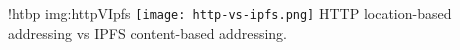 \namedfigure
{!htbp}
{img:httpVIpfs}
{\texttt{[image: http-vs-ipfs.png]}}
{HTTP location-based addressing vs IPFS content-based addressing.}
